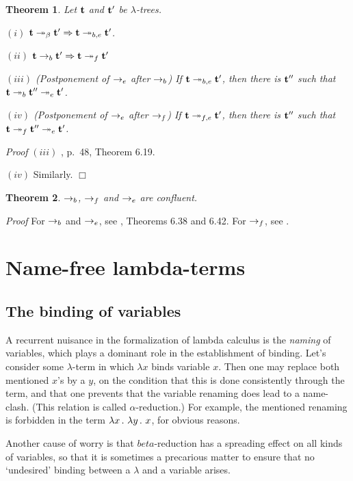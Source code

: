 \documentclass{article}
\theoremstyle{plain}
\newtheorem{The}{Theorem}[section]
\theoremstyle{definition}
\begin{document}
\begin{The}
Let ${\bf t}$ and ${\bf t'}$ be $\lambda$-trees.

$(i)$ ${\bf t} \twoheadrightarrow_\beta {\bf t}' \Rightarrow {\bf t} \twoheadrightarrow_{b,e} {\bf t}'$.

$(ii)$ ${\bf t} \rightarrow_b {\bf t}' \Rightarrow {\bf t} \twoheadrightarrow_f {\bf t}'$

$(iii)$ {\em (Postponement of $\rightarrow_e$ after $\rightarrow_b$)}  If ${\bf t} \twoheadrightarrow_{b,e} {\bf t'}$, then there is ${\bf t''}$ such that ${\bf t} \twoheadrightarrow_{b} {\bf t''} \twoheadrightarrow_e {\bf t'}$.

$(iv)$ {\em (Postponement of $\rightarrow_e$ after $\rightarrow_f$)} If ${\bf t} \twoheadrightarrow_{f,e} {\bf t'}$, then there is ${\bf t''}$ such that ${\bf t} \twoheadrightarrow_{f} {\bf t''} \twoheadrightarrow_e {\bf t'}$.
\end{The}
{\it Proof\/} $(iii)$ \citealp{Ned73}, p.\ 48, Theorem 6.19.

$(iv)$ Similarly. $\Box$

\begin{The}\label{TheConRed}
$\rightarrow_b$, $\rightarrow_f$ and $\rightarrow_e$ are confluent.
\end{The}
{\it Proof\/} For $\rightarrow_b$ and $\rightarrow_e$, see \citealp{Ned73}, Theorems 6.38 and 6.42. For $\rightarrow_f$, see \citealp{AccKes12}.


\section{Name-free lambda-terms}\label{SecNamFre}

\subsection{The binding of variables}

A recurrent nuisance in the formalization of lambda calculus is the {\it naming\/} of variables, which plays a dominant role in the establishment of binding. Let's consider some $\lambda$-term in which $\lambda x$ binds variable $x$. Then one may replace both mentioned $x$'s by a $y$, on the condition that this is done consistently through the term, and that one prevents that the variable renaming does lead to a name-clash. (This relation is called $\alpha$-reduction.) For example, the mentioned renaming is forbidden in the term $\lambda x \, . \,\, \lambda y \, . \,\, x$, for obvious reasons.

Another cause of worry is that $beta$-reduction has a spreading effect on all kinds of variables, so that it is sometimes a precarious matter to ensure that no `undesired' binding between a $\lambda$ and a variable arises.
\end{document}
